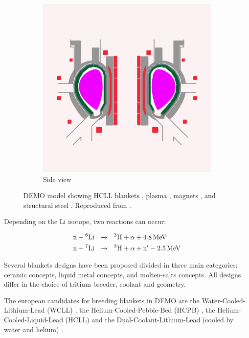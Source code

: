 \begin{figure}
\begin{subfigure}{0.45\linewidth}
        \includegraphics{Figures/Chapter1/blanket_shimwell_side_view.png}
        \caption{Side view}
    \end{subfigure}
    \caption{DEMO model showing HCLL blankets \cruleme[lithiumgreen]{0.3cm}{0.3cm}, plasma \cruleme[plasmapink]{0.3cm}{0.3cm}, magnets \cruleme[magnetred]{0.3cm}{0.3cm}, and structural steel \cruleme[steelgray]{0.3cm}{0.3cm}. Reproduced from \cite{shimwell_multiphysics_2019}.}
\end{figure}

Depending on the Li isotope, two reactions can occur:

\begin{align}
    \text{n} + \text{\textsuperscript{6}Li}  \ \ &\xrightarrow{} \ \ \text{\textsuperscript{3}H} + \alpha + \SI{4.8}{MeV}\\
    \text{n} + \text{\textsuperscript{7}Li}  \ \ &\xrightarrow{} \ \ \text{\textsuperscript{3}H} + \alpha + \text{n}' - \SI{2.5}{MeV} 
\end{align}

Several blankets designs have been proposed divided in three main categories: ceramic concepts, liquid metal concepts, and molten-salts concepts.
All designs differ in the choice of tritium breeder, coolant and geometry.

The european candidates for breeding blankets in DEMO are the Water-Cooled-Lithium-Lead (WCLL) , the Helium-Cooled-Pebble-Bed (HCPB) , the Helium-Cooled-Liquid-Lead (HCLL)  and the Dual-Coolant-Lithium-Lead (cooled by water and helium)  .


